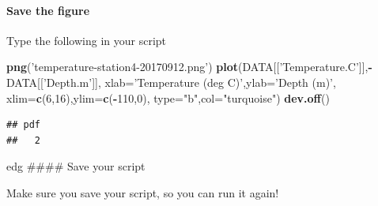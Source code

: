 \documentclass[
]{article}
\newenvironment{Shaded}{\begin{snugshade}}{\end{snugshade}}
\newcommand{\DataTypeTok}[1]{\textcolor[rgb]{0.13,0.29,0.53}{#1}}
\newcommand{\DecValTok}[1]{\textcolor[rgb]{0.00,0.00,0.81}{#1}}
\newcommand{\KeywordTok}[1]{\textcolor[rgb]{0.13,0.29,0.53}{\textbf{#1}}}
\newcommand{\NormalTok}[1]{#1}
\newcommand{\OperatorTok}[1]{\textcolor[rgb]{0.81,0.36,0.00}{\textbf{#1}}}
\newcommand{\StringTok}[1]{\textcolor[rgb]{0.31,0.60,0.02}{#1}}
\begin{document}
\hypertarget{save-the-figure}{%
\paragraph{Save the figure}\label{save-the-figure}}

Type the following in your script

\begin{Shaded}
\begin{Highlighting}[]
\KeywordTok{png}\NormalTok{(}\StringTok{'temperature-station4-20170912.png'}\NormalTok{)}
\KeywordTok{plot}\NormalTok{(DATA[[}\StringTok{'Temperature.C'}\NormalTok{]],}\OperatorTok{-}\NormalTok{DATA[[}\StringTok{'Depth.m'}\NormalTok{]],}
 \DataTypeTok{xlab=}\StringTok{'Temperature (deg C)'}\NormalTok{,}\DataTypeTok{ylab=}\StringTok{'Depth (m)'}\NormalTok{,}
 \DataTypeTok{xlim=}\KeywordTok{c}\NormalTok{(}\DecValTok{6}\NormalTok{,}\DecValTok{16}\NormalTok{),}\DataTypeTok{ylim=}\KeywordTok{c}\NormalTok{(}\OperatorTok{-}\DecValTok{110}\NormalTok{,}\DecValTok{0}\NormalTok{),}
 \DataTypeTok{type=}\StringTok{"b"}\NormalTok{,}\DataTypeTok{col=}\StringTok{"turquoise"}\NormalTok{)}
\KeywordTok{dev.off}\NormalTok{()}
\end{Highlighting}
\end{Shaded}

\begin{verbatim}
## pdf 
##   2
\end{verbatim}

edg \#\#\#\# Save your script

Make sure you save your script, so you can run it again!
\end{document}

